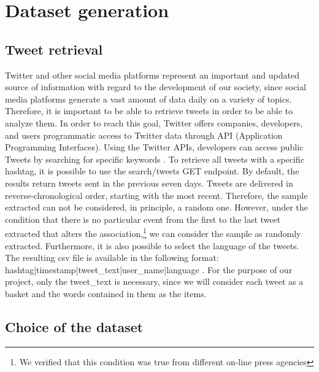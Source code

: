 \documentclass[12pt,%
               a4paper,%
               oneside,openany,%
               titlepage,%
               headinclude,footinclude,%
               BCOR5mm,%
               cleardoublepage=empty,%
               tablecaptionabove,%
               floatperchapter,
               ]{scrreprt}                 %
\begin{document}
\chapter{Dataset generation}

\section{Tweet retrieval}

Twitter and other social media platforms represent an important and updated source of information with regard to the development of our society, since social media platforms generate a vast amount of data daily on a variety of topics. Therefore, it is important to be able to retrieve tweets in order to be able to analyze them. In order to reach this goal, Twitter offers companies, developers, and users programmatic access to Twitter data through API (Application Programming Interfaces). Using the Twitter APIs, developers can access public Tweets by searching for specific keywords \cite{twitter}. To retrieve all tweets with a specific hashtag, it is possible to use the search/tweets GET endpoint. By default, the results return tweets sent in the previous seven days. Tweets are delivered in reverse-chronological order, starting with the most recent.  Therefore, the sample extracted can not be considered,  in principle,  a random one.  However, under the condition that there is no particular event from the first to the last tweet extracted that alters the association,\footnote{We verified that this condition was true from different on-line press agencies } we can consider the sample as randomly extracted.  Furthermore, it is also possible to select the language of the tweets. The resulting csv file is available in the following format: hashtag|timestamp|tweet\_text|user\_name|language . For the purpose of our project, only  the tweet\_text is necessary, since we will consider each tweet as a basket and the words contained in them as the items.

\section{Choice of the dataset}
\end{document}
